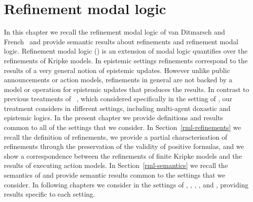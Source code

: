 \chapter{Refinement modal logic}\label{rml}

In this chapter we recall the refinement modal logic of van Ditmarsch and French~\cite{vanditmarsch:2009} and provide semantic results about refinements and refinement modal logic.
Refinement modal logic (\logicRml{}) is an extension of modal logic quantifies over the refinements of Kripke models.
In epistemic settings refinements correspond to the results of a very general notion of epistemic updates.
However unlike public announcements or action models, refinements in general are not backed by a model or operation for epistemic updates that produces the results.  
In contrast to previous treatments of \logicRml{}~\cite{vanditmarsch:2009,vanditmarsch:2010}, which considered \logicRml{} specifically in the setting of \classK{}, our treatment considers \logicRml{} in different settings, including multi-agent doxastic and epistemic logics.
In the present chapter we provide definitions and results common to all of the settings that we consider.
In Section~\ref{rml-refinements} we recall the definition of refinements, we provide a partial characterisation of refinements through the preservation of the validity of positive formulas, and we show a correspondence between the refinements of finite Kripke models and the results of executing action models.
In Section~\ref{rml-semantics} we recall the semantics of \logicRml{} and provide semantic results common to the settings that we consider.
In following chapters we consider \logicRml{} in the settings of \classK{}, \classKFF{}, \classKD{}, \classS{}, and \classKF{}, providing results specific to each setting.



